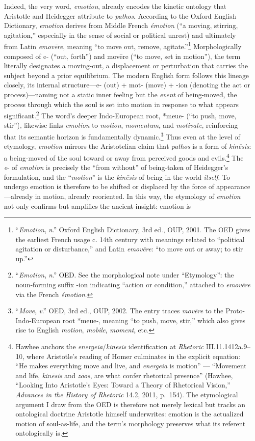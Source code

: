 \documentclass{article}
\begin{document}
Indeed, the very word, \textit{emotion}, already encodes the kinetic ontology that Aristotle and Heidegger attribute to \textit{pathos}. According to the Oxford English Dictionary, \textit{emotion} derives from Middle French \textit{émotion} (“a moving, stirring, agitation,” especially in the sense of social or political unrest) and ultimately from Latin \textit{emovēre}, meaning “to move out, remove, agitate.”\footnote{“\textit{Emotion}, \textit{n}.” Oxford English Dictionary, 3rd ed., OUP, 2001. The OED gives the earliest French usage c. 14th century with meanings related to “political agitation or disturbance,” and Latin \textit{emovēre}: “to move out or away; to stir up.”} Morphologically composed of e- (“out, forth”) and movēre (“to move, set in motion”), the term  literally designates a moving-out, a displacement or perturbation that carries the subject beyond a prior equilibrium. The modern English form follows this lineage closely, its internal structure—e- (out) + mot- (move) + -ion (denoting the act or process)—naming not a static inner feeling but the \textit{event} of being-moved, the process through which the soul is set into motion in response to what appears significant.\footnote{“\textit{Emotion}, \textit{n}.” OED. See the morphological note under “Etymology”: the noun-forming suffix -ion indicating “action or condition,” attached to \textit{emovēre} via the French \textit{émotion}.} The word’s deeper Indo-European root, *meue- (“to push, move, stir”), likewise links \textit{emotion} to \textit{motion}, \textit{momentum}, and \textit{motivate}, reinforcing that its semantic horizon is fundamentally dynamic.\footnote{“\textit{Move}, \textit{v}.” OED, 3rd ed., OUP, 2002. The entry traces \textit{movēre} to the Proto-Indo-European root *meue-, meaning “to push, move, stir,” which also gives rise to English \textit{motion}, \textit{mobile}, \textit{moment}, etc.}  Thus even at the level of etymology, \textit{emotion} mirrors the Aristotelian claim that \textit{pathos} is a form of \textit{kinēsis}: a being-moved of the soul toward or away from perceived goods and evils.\footnote{Hawhee anchors the \textit{energeia}/\textit{kinēsis} identification at \textit{Rhetoric} III.11.1412a.9--10, where Aristotle's reading of Homer culminates in the explicit equation: ``He makes everything move and live, and \textit{energeia} is motion'' --- ``Movement and life, \textit{kinēsis} and \textit{zōos}, are what confer rhetorical presence'' (Hawhee, ``Looking Into Aristotle's Eyes: Toward a Theory of Rhetorical Vision,'' \textit{Advances in the History of Rhetoric} 14.2, 2011, p.~154). The etymological argument I draw from the OED is therefore not merely lexical but tracks an ontological doctrine Aristotle himself underwrites: emotion is the actualized motion of soul-as-life, and the term's morphology preserves what its referent ontologically is.} The \textit{e}- of \textit{emotion} is precisely the ``from without'' of being-taken of Heidegger's formulation, and the ``\textit{motion}'' is the \textit{kinēsis} of being-in-the-world \textit{itself}. To undergo emotion is therefore to be shifted or displaced by the force of appearance—already in motion, already reoriented. In this way, the etymology of \textit{emotion} not only confirms but amplifies the ancient insight: emotion is 
\end{document}
